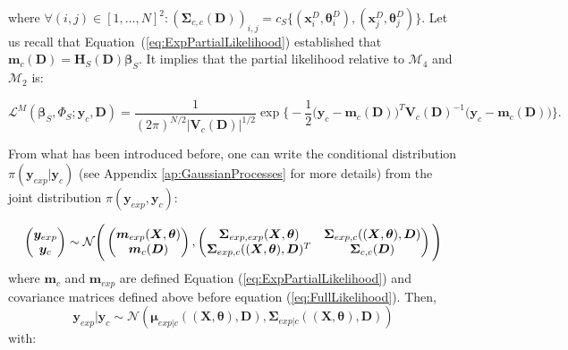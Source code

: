 \documentclass[soumission]{jsfds}
\edef\hc{\string: }
\begin{document}
where $\forall (i,j)\in [1,\dots,N]^2: (\boldsymbol{\Sigma}_{c,c}(\boldsymbol{D}))_{i,j}=c_S\{(\boldsymbol{x}_i^D,\boldsymbol{\theta}_i^D),(\boldsymbol{x}_j^D,\boldsymbol{\theta}_j^D)\}$. Let us recall that Equation~(\ref{eq:ExpPartialLikelihood}) established that $\boldsymbol{m}_c(\boldsymbol{D}) ={\boldsymbol{H}_S}(\boldsymbol{D})\boldsymbol{\beta}_S$. It implies that the partial likelihood relative to $\mathcal{M}_4$ and $\mathcal{M}_2$ is\hc


\begin{equation}
\mathcal{L}^M(\boldsymbol{\beta}_S,\Phi_S;\boldsymbol{y}_c,\boldsymbol{D})=\frac{1}{(2\pi)^{N/2}|\boldsymbol{V}_c(\boldsymbol{D})|^{1/2}}\exp\Bigg\{-\frac{1}{2}\Big(\boldsymbol{y}_c-\boldsymbol{m}_c(\boldsymbol{D})\Big)^T\boldsymbol{V}_c(\boldsymbol{D})^{-1}\Big(\boldsymbol{y}_c-\boldsymbol{m}_c(\boldsymbol{D})\Big)\Bigg\}.
\label{eq:PartialLikelihood}
\end{equation}



From what has been introduced before, one can write the conditional distribution $\pi(\boldsymbol{y}_{exp}|\boldsymbol{y}_c)$ (see Appendix \ref{ap:GaussianProcesses} for more details) from the joint distribution $\pi(\boldsymbol{y}_{exp},\boldsymbol{y}_c)$\hc

\begin{equation*}
\begin{pmatrix}
\boldsymbol{y}_{exp}\\
\boldsymbol{y}_c
\end{pmatrix} \sim \mathcal{N}\Bigg(\begin{pmatrix}
\boldsymbol{m}_{exp}(\boldsymbol{X},\boldsymbol{\theta})\\
\boldsymbol{m}_c(\boldsymbol{D})
\end{pmatrix}, \begin{pmatrix}
\boldsymbol{\Sigma}_{exp,exp}(\boldsymbol{X},\boldsymbol{\theta}) & \boldsymbol{\Sigma}_{exp,c}((\boldsymbol{X},\boldsymbol{\theta}),\boldsymbol{D})\\
\boldsymbol{\Sigma}_{exp,c}((\boldsymbol{X},\boldsymbol{\theta}),\boldsymbol{D})^T & \boldsymbol{\Sigma}_{c,c}(\boldsymbol{D})
\end{pmatrix}\Bigg)\\
\end{equation*}
where $\boldsymbol{m}_c$ and $\boldsymbol{m}_{exp}$ are defined Equation (\ref{eq:ExpPartialLikelihood}) and covariance matrices defined above before equation (\ref{eq:FullLikelihood}). Then,
\begin{equation*}
\boldsymbol{y}_{exp}|\boldsymbol{y}_c\sim\mathcal{N}(\boldsymbol{\mu}_{exp|c}((\boldsymbol{X},\boldsymbol{\theta}),\boldsymbol{D}),\boldsymbol{\Sigma}_{exp|c}((\boldsymbol{X},\boldsymbol{\theta}),\boldsymbol{D}))
\end{equation*}
with\hc
\end{document}
